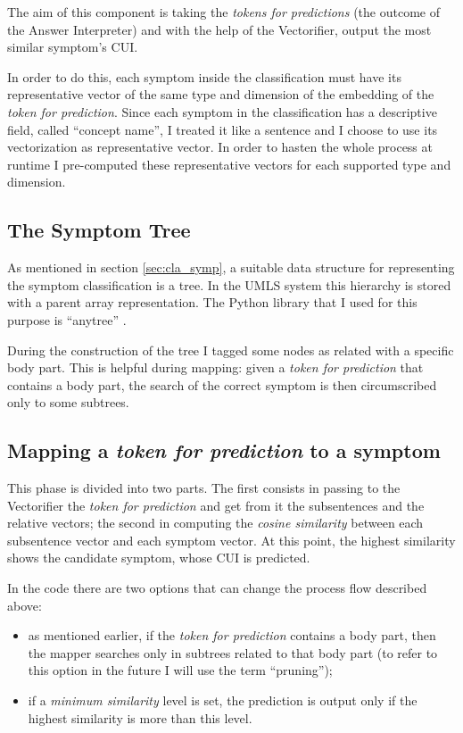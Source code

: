 The aim of this component is taking the \textit{tokens for predictions} (the outcome of the Answer Interpreter) and with the help of the Vectorifier, output the most similar symptom's CUI.

In order to do this, each symptom inside the classification must have its representative vector of the same type and dimension of the embedding of the \textit{token for prediction}. Since each symptom in the classification has a descriptive field, called ``concept name'', I treated it like a sentence and I choose to use its vectorization as representative vector. In order to hasten the whole process at runtime I pre-computed these representative vectors for each supported type and dimension.

\subsection{The Symptom Tree}
As mentioned in section \ref{sec:cla_symp}, a suitable data structure for representing the symptom classification is a tree. In the UMLS system this hierarchy is stored with a parent array representation. The Python library that I used for this purpose is ``anytree'' \cite{anytree}.

During the construction of the tree I tagged some nodes as related with a specific body part. This is helpful during mapping: given a \textit{token for prediction} that contains a body part, the search of the correct symptom is then circumscribed only to some subtrees.

\subsection{Mapping a \textit{token for prediction} to a symptom}
This phase is divided into two parts. The first consists in passing to the Vectorifier the \textit{token for prediction} and get from it the subsentences and the relative vectors; the second in computing the \textit{cosine similarity} between each subsentence vector and each symptom vector. At this point, the highest similarity shows the candidate symptom, whose CUI is predicted.

In the code there are two options that can change the process flow described above:
\begin{itemize}
  \item as mentioned earlier, if the \textit{token for prediction} contains a body part, then the mapper searches only in subtrees related to that body part (to refer to this option in the future I will use the term ``pruning'');
  \item if a \textit{minimum similarity} level is set, the prediction is output only if the highest similarity is more than this level. 
\end{itemize}
